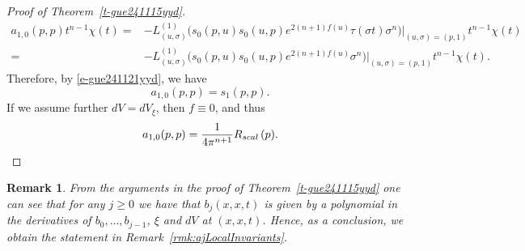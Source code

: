 \documentclass[12pt]{amsart}
\newtheorem{remark}[theorem]{Remark}
\theoremstyle{definition}
\theoremstyle{named}
\numberwithin{equation}{subsection}
\begin{document}
\begin{proof}[Proof of Theorem~\ref{t-gue241115yyd}]
\begin{align}
    a_{1,0}(p,p)t^{n-1}\chi(t)=&-L^{(1)}_{(u,\sigma)}\Big(s_0(p,u)s_0(u,p)e^{2(n+1)f(u)}\tau(\sigma t)\sigma^n\Big)|_{(u,\sigma)=(p,1)}t^{n-1}\chi(t)\nonumber\\=&-
    L^{(1)}_{(u,\sigma)}\Big(s_0(p,u)s_0(u,p)e^{2(n+1)f(u)}\sigma^n\Big)|_{(u,\sigma)=(p,1)}t^{n-1}\chi(t).
\end{align}
Therefore, by \eqref{e-gue241121yyd}, we have
\begin{equation}
    a_{1,0}(p,p)=s_1(p,p).
\end{equation}
If we assume further $dV=dV_\xi$, then $f\equiv 0$, and thus
\begin{equation}
    a_{1,0}(p,p)=\frac{1}{4\pi^{n+1}}R_{{\rm scal\,}}(p).
\end{equation}
\end{proof} 
\begin{remark}\label{rmk:verifyargumentrmklocalinvariant}
	From the arguments in the proof of Theorem~\ref{t-gue241115yyd} one can see that for any \(j\geq 0\) we have that \(b_j(x,x,t)\) is given by a polynomial in the derivatives of \(b_0,\ldots,b_{j-1}\), \(\xi\) and \(dV\) at \((x,x,t)\). Hence, as a conclusion, we obtain the statement in Remark~\ref{rmk:ajLocalInvariants}.
\end{remark}
\end{document}
